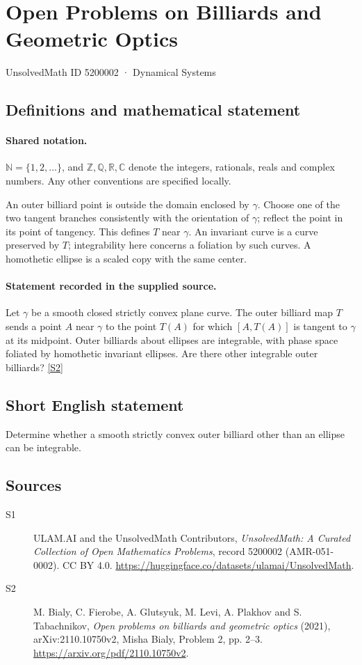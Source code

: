 \documentclass[11pt]{article}
\newcommand{\sref}[2]{\hyperlink{source:#1:#2}{[S#2]}}
\begin{document}
\setcounter{section}{5200001}
\section{Open Problems on Billiards and Geometric Optics}\label{5200002}
{\small\sffamily UnsolvedMath ID 5200002 · Dynamical Systems}
\subsection{Definitions and mathematical statement}

\paragraph{Shared notation.}$\mathbb N=\{1,2,\ldots\}$, and $\mathbb Z,\mathbb Q,\mathbb R,\mathbb C$ denote the integers, rationals, reals and complex numbers. Any other conventions are specified locally.


An outer billiard point is outside the domain enclosed by $\gamma$. Choose one of the two tangent branches consistently with the orientation of $\gamma$; reflect the point in its point of tangency. This defines $T$ near $\gamma$. An invariant curve is a curve preserved by $T$; integrability here concerns a foliation by such curves. A homothetic ellipse is a scaled copy with the same center.
\paragraph{Statement recorded in the supplied source.}
Let $\gamma$ be a smooth closed strictly convex plane curve. The outer billiard map $T$ sends a point $A$ near $\gamma$ to the point $T(A)$ for which $[A,T(A)]$ is tangent to $\gamma$ at its midpoint. Outer billiards about ellipses are integrable, with phase space foliated by homothetic invariant ellipses. Are there other integrable outer billiards? \sref{5200002}{2}
\subsection{Short English statement}
Determine whether a smooth strictly convex outer billiard other than an ellipse can be integrable.
\subsection{Sources}
\begin{description}
\item[\hypertarget{source:5200002:1}{S1}] ULAM.AI and the UnsolvedMath Contributors, \emph{UnsolvedMath: A Curated Collection of Open Mathematics Problems}, record 5200002 (AMR-051-0002). CC BY 4.0. \url{https://huggingface.co/datasets/ulamai/UnsolvedMath}.
\item[\hypertarget{source:5200002:2}{S2}] M. Bialy, C. Fierobe, A. Glutsyuk, M. Levi, A. Plakhov and S. Tabachnikov, \emph{Open problems on billiards and geometric optics} (2021), arXiv:2110.10750v2, Misha Bialy, Problem 2, pp. 2--3. \url{https://arxiv.org/pdf/2110.10750v2}.
\end{description}
\label{end:5200002}
\end{document}
